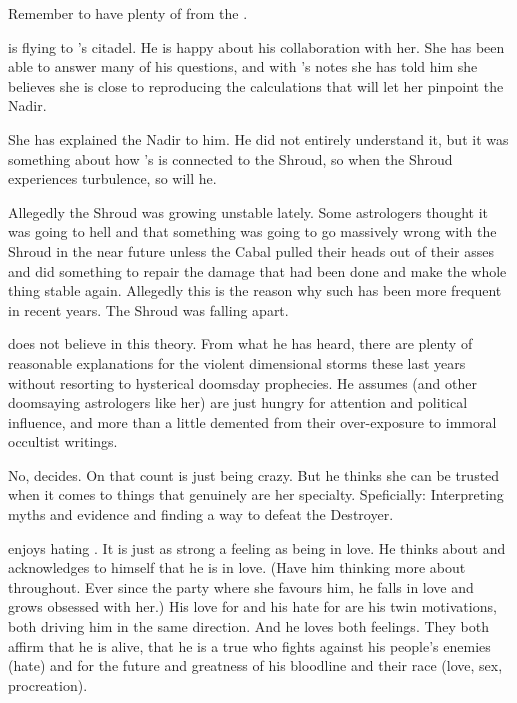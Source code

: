 

Remember to have plenty of  from the \resphain. 

\Teshrial is flying to \Urizeth's citadel. 
He is happy about his collaboration with her. 
She has been able to answer many of his questions, and with \Lothagiel's notes she has told him she believes she is close to reproducing the calculations that will let her pinpoint the Nadir. 

She has explained the Nadir to him. 
He did not entirely understand it, but it was something about how \Ishnaruchaefir's \vertex is connected to the Shroud, so when the Shroud experiences turbulence, so will he. 

Allegedly the Shroud was growing unstable lately. 
Some astrologers thought it was going to hell and that something was going to go massively wrong with the Shroud in the near future unless the Cabal pulled their heads out of their asses and did something to repair the damage that had been done and make the whole thing stable again. 
Allegedly this  is the reason why such  has been more frequent in recent years. 
The Shroud was falling apart. 

\Teshrial does not believe in this theory. 
From what he has heard, there are plenty of reasonable explanations for the violent dimensional storms these last years without resorting to hysterical doomsday prophecies. 
He assumes \Urizeth (and other doomsaying astrologers like her) are just hungry for attention and political influence, and more than a little demented from their over-exposure to immoral occultist writings. 

No, \Teshrial decides. 
On that count \Urizeth is just being crazy. 
But he thinks she can be trusted when it comes to things that genuinely are her specialty. 
Speficially: 
Interpreting myths and evidence and finding a way to defeat the Destroyer. 

\Teshrial enjoys hating \Ishnaruchaefir.
It is just as strong a feeling as being in love.
He thinks about \Firaxel and acknowledges to himself that he is in love.
(Have him thinking more about \Firaxel throughout. Ever since the party where she favours him, he falls in love and grows obsessed with her.)
His love for \Firaxel and his hate for \Ishnaruchaefir are his twin motivations, both driving him in the same direction.
And he loves both feelings.
They both affirm that he is alive, that he is a true \resphan who fights against his people's enemies (hate) and for the future and greatness of his bloodline and their race (love, sex, procreation).



